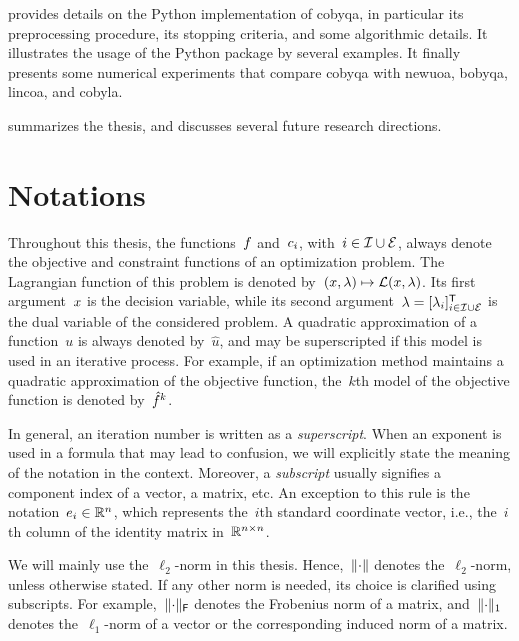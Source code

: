  provides details on the Python implementation of \gls{cobyqa}, in particular its preprocessing procedure, its stopping criteria, and some algorithmic details.
It illustrates the usage of the Python package by several examples.
It finally presents some numerical experiments that compare \gls{cobyqa} with \gls{newuoa}, \gls{bobyqa}, \gls{lincoa}, and \gls{cobyla}.

 summarizes the thesis, and discusses several future research directions.

\section{Notations}

Throughout this thesis, the functions~$f$ and~$c_{i}$, with~$i \in \mathcal{I} \cup \mathcal{E}$, always denote the objective and constraint functions of an optimization problem.
The Lagrangian function of this problem is denoted by~$(\iter, \lm) \mapsto \lag(\iter, \lm)$.
Its first argument~$\iter$ is the decision variable, while its second argument~$\lm = [\lm_i]_{i \in \iub \cup \ieq}^{\T}$ is the dual variable of the considered problem.
A quadratic approximation of a function~$u$ is always denoted by~$\hat{u}$, and may be superscripted if this model is used in an iterative process.
For example, if an optimization method maintains a quadratic approximation of the objective function, the~$k$th model of the objective function is denoted by~$\objm[k]$.

In general, an iteration number is written as a \emph{superscript}.
When an exponent is used in a formula that may lead to confusion, we will explicitly state the meaning of the notation in the context.
Moreover, a \emph{subscript} usually signifies a component index of a vector, a matrix, etc.
An exception to this rule is the notation~$e_i \in \mathbb{R}^n$, which represents the~$i$th standard coordinate vector, i.e., the~$i$th column of the identity matrix in~$\mathbb{R}^{n \times n}$.

We will mainly use the~$\ell_2$-norm in this thesis.
Hence,~$\lVert\cdot\rVert$ denotes the~$\ell_2$-norm, unless otherwise stated.
If any other norm is needed, its choice is clarified using subscripts.
For example,~$\lVert\cdot\rVert_{\mathsf{F}}$ denotes the Frobenius norm of a matrix, and~$\lVert\cdot\rVert_1$ denotes the~$\ell_1$-norm of a vector or the corresponding induced norm of a matrix.

